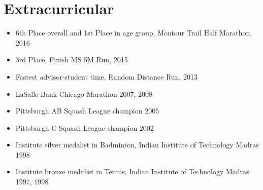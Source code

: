 
\section{Extracurricular}
\begin{itemize}
\addtolength{\itemsep}{-0.5\baselineskip}
\item 6th Place overall and 1st Place in age group, Montour Trail Half Marathon, 2016
\item 3rd Place, Finish MS 5M Run, 2015 
\item Fastest advisor-student time, Random Distance Run, 2013
\item LaSalle Bank Chicago Marathon 2007, 2008
\item Pittsburgh AB Squash League champion 2005
\item Pittsburgh C Squash League champion 2002
\item Institute silver medalist in Badminton, Indian Institute of Technology Madras 1998
\item Institute bronze medalist in Tennis, Indian Institute of Technology Madras 1997, 1998
\end{itemize}
